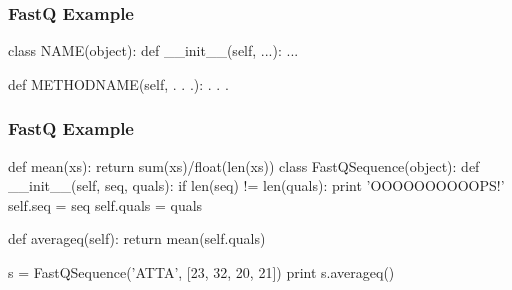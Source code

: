 \begin{frame}[fragile]
\frametitle{FastQ Example}

\begin{python}
class NAME(object):
    def __init__(self, ...):
        ...

    def METHODNAME(self, . . .):
        . . .
\end{python}

\end{frame}

\begin{frame}[fragile]
\frametitle{FastQ Example}

\begin{python}
def mean(xs):
    return sum(xs)/float(len(xs))
class FastQSequence(object):
    def __init__(self, seq, quals):
        if len(seq) != len(quals):
            print 'OOOOOOOOOOPS!'
        self.seq = seq
        self.quals = quals

    def averageq(self):
        return mean(self.quals)

s = FastQSequence('ATTA', [23, 32, 20, 21])
print s.averageq()
\end{python}

\end{frame}



